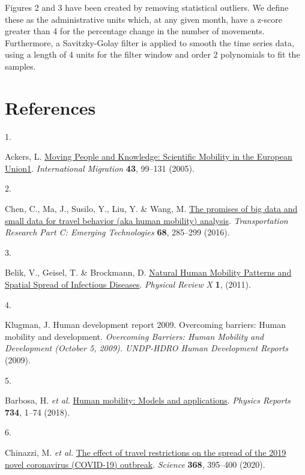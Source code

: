 \documentclass[
  11pt,
]{article}
\newlength{\cslhangindent}
\newlength{\csllabelwidth}
\newenvironment{CSLReferences}[2] %
 {\begin{list}{}{%
  \setlength{\itemindent}{0pt}
  \setlength{\leftmargin}{0pt}
  \setlength{\parsep}{0pt}
  \ifodd #1
   \setlength{\leftmargin}{\cslhangindent}
   \setlength{\itemindent}{-1\cslhangindent}
  \fi
  \setlength{\itemsep}{#2\baselineskip}}}
 {\end{list}}
\newcommand{\CSLLeftMargin}[1]{\parbox[t]{\csllabelwidth}{\strut#1\strut}}
\newcommand{\CSLRightInline}[1]{\parbox[t]{\linewidth - \csllabelwidth}{\strut#1\strut}}
\begin{document}
Figures 2 and 3 have been created by removing statistical outliers. We
define these as the administrative units which, at any given month, have
a z-score greater than 4 for the percentage change in the number of
movements. Furthermore, a Savitzky-Golay filter is applied to smooth the
time series data, using a length of 4 units for the filter window and
order 2 polynomials to fit the samples.

\section*{References}\label{references}

\label{refs}
\begin{CSLReferences}{0}{0}
\CSLLeftMargin{1. }%
\CSLRightInline{Ackers, L.
\href{https://doi.org/10.1111/j.1468-2435.2005.00343.x}{Moving People
and Knowledge: Scientific Mobility in the European Union1}.
\emph{International Migration} \textbf{43}, 99--131 (2005).}

\CSLLeftMargin{2. }%
\CSLRightInline{Chen, C., Ma, J., Susilo, Y., Liu, Y. \& Wang, M.
\href{https://doi.org/10.1016/j.trc.2016.04.005}{The promises of big
data and small data for travel behavior (aka human mobility) analysis}.
\emph{Transportation Research Part C: Emerging Technologies}
\textbf{68}, 285--299 (2016).}

\CSLLeftMargin{3. }%
\CSLRightInline{Belik, V., Geisel, T. \& Brockmann, D.
\href{https://doi.org/10.1103/physrevx.1.011001}{Natural Human Mobility
Patterns and Spatial Spread of Infectious Diseases}. \emph{Physical
Review X} \textbf{1}, (2011).}

\CSLLeftMargin{4. }%
\CSLRightInline{Klugman, J. Human development report 2009. Overcoming
barriers: Human mobility and development. \emph{Overcoming Barriers:
Human Mobility and Development (October 5, 2009). UNDP-HDRO Human
Development Reports} (2009).}

\CSLLeftMargin{5. }%
\CSLRightInline{Barbosa, H. \emph{et al.}
\href{https://doi.org/10.1016/j.physrep.2018.01.001}{Human mobility:
Models and applications}. \emph{Physics Reports} \textbf{734}, 1--74
(2018).}

\CSLLeftMargin{6. }%
\CSLRightInline{Chinazzi, M. \emph{et al.}
\href{https://doi.org/10.1126/science.aba9757}{The effect of travel
restrictions on the spread of the 2019 novel coronavirus (COVID-19)
outbreak}. \emph{Science} \textbf{368}, 395--400 (2020).}


\end{CSLReferences}
\end{document}
